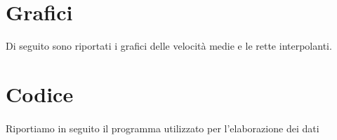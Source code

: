\documentclass[12pt]{article} %
\begin{document}
\section {Grafici}
	Di seguito sono riportati i grafici delle velocità medie e le rette interpolanti.
	\subsection {}
	
\section{Codice}	

\paragraph{}
	Riportiamo in seguito il programma utilizzato per l'elaborazione dei dati
	\begin{verbatim}

	\end{verbatim}


\end{document}

